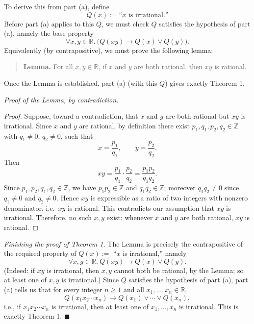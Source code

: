 \documentclass[11pt]{article}
\newcommand{\R}{\mathbb{R}}
\newcommand{\Z}{\mathbb{Z}}
\newcommand{\partlabel}[1]{%
    \noindent\makebox[2em][l]{\textbf{(#1)}}%
}
\begin{document}
To derive this from part (a), define
\[
Q(x) := \text{``$x$ is irrational.''}
\]
Before part (a) applies to this $Q$, we must check $Q$ satisfies the hypothesis of part (a), namely the base property
\[
\forall x, y \in \R.\ \big( Q(xy) \rightarrow Q(x) \vee Q(y) \big).
\]
Equivalently (by contrapositive), we must prove the following lemma:

\begin{quote}
\textbf{Lemma.} For all $x, y \in \R$, if $x$ and $y$ are both rational, then $xy$ is rational.
\end{quote}

Once the Lemma is established, part (a) (with this $Q$) gives exactly Theorem 1.

\medskip
\partlabel{c}
\emph{Proof of the Lemma, by contradiction.}
\begin{proof}
Suppose, toward a contradiction, that $x$ and $y$ are both rational but $xy$ is irrational. Since $x$ and $y$ are rational, by definition there exist $p_1, q_1, p_2, q_2 \in \Z$ with $q_1 \ne 0$, $q_2 \ne 0$, such that
\[
x = \frac{p_1}{q_1}, \qquad y = \frac{p_2}{q_2}.
\]
Then
\[
xy = \frac{p_1}{q_1}\cdot\frac{p_2}{q_2} = \frac{p_1 p_2}{q_1 q_2}.
\]
Since $p_1, p_2, q_1, q_2 \in \Z$, we have $p_1 p_2 \in \Z$ and $q_1 q_2 \in \Z$; moreover $q_1 q_2 \ne 0$ since $q_1 \ne 0$ and $q_2 \ne 0$. Hence $xy$ is expressible as a ratio of two integers with nonzero denominator, i.e.\ $xy$ is rational. This contradicts our assumption that $xy$ is irrational. Therefore, no such $x, y$ exist: whenever $x$ and $y$ are both rational, $xy$ is rational.
\end{proof}

\emph{Finishing the proof of Theorem 1.} The Lemma is precisely the contrapositive of the required property of $Q(x) := $ ``$x$ is irrational,'' namely
\[
\forall x,y \in \R.\ Q(xy) \rightarrow Q(x) \vee Q(y).
\]
(Indeed: if $xy$ is irrational, then $x,y$ cannot both be rational, by the Lemma; so at least one of $x, y$ is irrational.) Since $Q$ satisfies the hypothesis of part (a), part (a) tells us that for every integer $n \ge 1$ and all $x_1, \dots, x_n \in \R$,
\[
Q(x_1 x_2 \cdots x_n) \rightarrow Q(x_1) \vee \cdots \vee Q(x_n),
\]
i.e., if $x_1 x_2 \cdots x_n$ is irrational, then at least one of $x_1, \dots, x_n$ is irrational. This is exactly Theorem 1. $\blacksquare$
\end{document}
